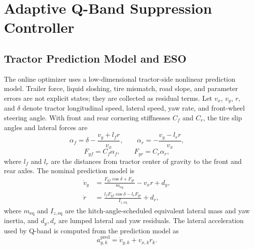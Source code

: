 \section{Adaptive Q-Band Suppression Controller}




\subsection{Tractor Prediction Model and ESO}
The online optimizer uses a low-dimensional tractor-side nonlinear prediction model. Trailer force, liquid sloshing, tire mismatch, road slope, and parameter errors are not explicit states; they are collected as residual terms. Let $v_x$, $v_y$, $r$, and $\delta$ denote tractor longitudinal speed, lateral speed, yaw rate, and front-wheel steering angle. With front and rear cornering stiffnesses $C_f$ and $C_r$, the tire slip angles and lateral forces are
\begin{equation}
    \alpha_f=\delta-\frac{v_y+l_fr}{v_x},\qquad
    \alpha_r=-\frac{v_y-l_rr}{v_x},
\end{equation}
\begin{equation}
    F_{yf}=C_f\alpha_f,\qquad F_{yr}=C_r\alpha_r ,
\end{equation}
where $l_f$ and $l_r$ are the distances from tractor center of gravity to the front and rear axles. The nominal prediction model is
\begin{equation}
\begin{aligned}
    \dot v_y &= \frac{F_{yf}\cos\delta+F_{yr}}{m_{\mathrm{eq}}}-v_xr+d_y,\\
    \dot r &= \frac{l_fF_{yf}\cos\delta-l_rF_{yr}}{I_{z,\mathrm{eq}}}+d_r ,
\end{aligned}
\label{eq:tractor_2dof}
\end{equation}
where $m_{\mathrm{eq}}$ and $I_{z,\mathrm{eq}}$ are the hitch-angle-scheduled equivalent lateral mass and yaw inertia, and $d_y,d_r$ are lumped lateral and yaw residuals. The lateral acceleration used by Q-band is computed from the prediction model as
\begin{equation}
    a_{y,k}^{\mathrm{pred}}=\dot v_{y,k}+v_{x,k}r_k .
    \label{eq:ay_prediction}
\end{equation}

